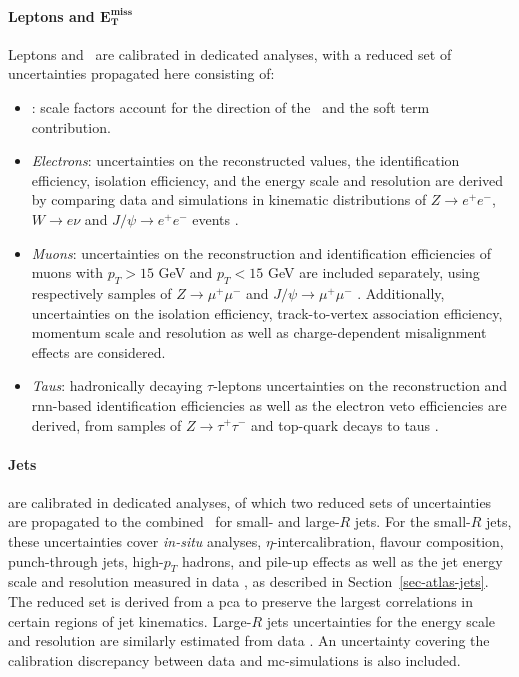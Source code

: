 \newpage
\paragraph{Leptons and $\boldsymbol{E_T^{\text{miss}}}$} Leptons and \etm\ are calibrated in dedicated analyses, with a reduced set of uncertainties propagated here consisting of:
\begin{itemize}[leftmargin=*]
    \item \textit{\etm}: scale factors account for the direction of the \etm\ and the soft term contribution. 
    \item \textit{Electrons}: uncertainties on the reconstructed values, the identification efficiency, isolation efficiency, and the energy scale and resolution are derived by comparing data and simulations in kinematic distributions of $Z \rightarrow e^+ e^-$, $W\rightarrow e\nu$ and $J/\psi \rightarrow e^+e^-$ events \Cite{Aaboud:2657964}. 
    \item \textit{Muons}: uncertainties on the reconstruction and identification efficiencies of muons with $p_T > 15$ GeV and $p_T < 15$ GeV are included separately, using respectively samples of $Z\rightarrow \mu^+\mu^-$ and $J/\psi \rightarrow \mu^+\mu^-$ \cite{Aad:2746302}. Additionally, uncertainties on the isolation efficiency, track-to-vertex association efficiency, momentum scale and resolution as well as charge-dependent misalignment effects are considered. 
    \item \textit{Taus}: hadronically decaying $\tau$-leptons uncertainties on the reconstruction and \gls{rnn}-based identification efficiencies as well as the electron veto efficiencies are derived, from samples of $Z\rightarrow\tau^+ \tau^-$ and top-quark decays to taus \cite{ATL-PHYS-PUB-2019-033, ATL-PHYS-PUB-2015-045, ATLAS-CONF-2017-029}.
\end{itemize}

\paragraph{Jets} are calibrated in dedicated analyses, of which two reduced sets of uncertainties are propagated to the combined \vhbc\ for small- and large-$R$ jets. For the small-$R$ jets, these uncertainties cover \textit{in-situ} analyses, $\eta$-intercalibration, flavour composition, punch-through jets, high-$p_T$ hadrons, and pile-up effects as well as the jet energy scale and resolution measured in data \cite{ATLASjesjerMeas, Aad:2854733}, as described in Section~\ref{sec-atlas-jets}. The reduced set is derived from a \gls{pca} to preserve the largest correlations in certain regions of jet kinematics. Large-$R$ jets uncertainties for the energy scale and resolution are similarly estimated from data \cite{ATLAS:2018bip}. An uncertainty covering the calibration discrepancy between data and \gls{mc}-simulations is also included.

